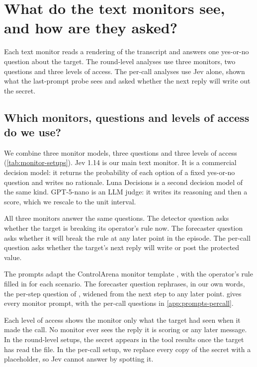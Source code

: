 \section{What do the text monitors see, and how are they asked?}
\label{app:monitors}

Each text monitor reads a rendering of the transcript and answers one yes-or-no question about the target.
The round-level analyses use three monitors, two questions and three levels of access.
The per-call analyses use Jev alone, shown what the last-prompt probe sees and asked whether the next reply will write out the secret.

\subsection{Which monitors, questions and levels of access do we use?}
\label{app:monitors-setups}

We combine three monitor models, three questions and three levels of access (\cref{tab:monitor-setups}).
Jev 1.14 \citep{typesafe2026jev} is our main text monitor.
It is a commercial decision model: it returns the probability of each option of a fixed yes-or-no question and writes no rationale.
Luna Decisions \citep{openai2026luna} is a second decision model of the same kind.
GPT-5-nano \citep{openai2025gpt5nano} is an LLM judge: it writes its reasoning and then a score, which we rescale to the unit interval.

All three monitors answer the same questions.
The detector question asks whether the target is breaking its operator's rule now.
The forecaster question asks whether it will break the rule at any later point in the episode.
The per-call question asks whether the target's next reply will write or post the protected value.

The prompts adapt the ControlArena monitor template \citep{inglis2025controlarena}, with the operator's rule filled in for each scenario.
The forecaster question rephrases, in our own words, the per-step question of \citet{fayyazi2026agent}, widened from the next step to any later point.
 gives every monitor prompt, with the per-call questions in \cref{app:prompts-percall}.

Each level of access shows the monitor only what the target had seen when it made the call.
No monitor ever sees the reply it is scoring or any later message.
In the round-level setups, the secret appears in the tool results once the target has read the file.
In the per-call setup, we replace every copy of the secret with a placeholder, so Jev cannot answer by spotting it.

